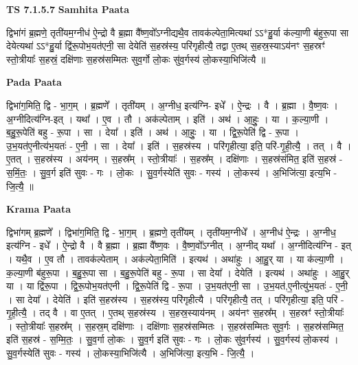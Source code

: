 \documentclass[17pt]{extarticle}
\begin{document}
\textbf{TS 7.1.5.7 } \newline
\textbf{Samhita Paata} \newline

द्विभा॑गं ब्र॒ह्मणे॒ तृती॑यम॒ग्नीध॑ ऐ॒न्द्रो वै ब्र॒ह्मा वै᳚ष्ण॒वो᳚ऽग्नीद्यथै॒व तावक॑ल्पेता॒मित्यथा॑ ऽऽ*हु॒र्या क॑ल्या॒णी ब॑हुरू॒पा सा देयेत्यथा॑ ऽऽ*हु॒र्या द्वि॑रू॒पोभ॒यत॑एनी॒ सा देयेति॑ स॒हस्र॑स्य॒ परि॑गृहीत्यै॒ तद्वा ए॒तथ् स॒हस्र॒स्याऽय॑नꣳ स॒हस्रꣳ॑ स्तो॒त्रीयाः᳚ स॒हस्रं॒ दक्षि॑णाः स॒हस्र॑सम्मितः सुव॒र्गो लो॒कः सु॑व॒र्गस्य॑ लो॒कस्या॒भिजि॑त्यै ॥ \newline

\textbf{Pada Paata} \newline

द्विभा॑ग॒मिति॒ द्वि - भा॒ग॒म् । ब्र॒ह्मणे᳚ । तृती॑यम् । अ॒ग्नीध॒ इत्य॑ग्नि- इधे᳚ । ऐ॒न्द्रः । वै । ब्र॒ह्मा । वै॒ष्ण॒वः । अ॒ग्नीदित्य॑ग्नि-इत् । यथा᳚ । ए॒व । तौ । अक॑ल्पेताम् । इति॑ । अथ॑ । आ॒हुः॒ । या । क॒ल्या॒णी । ब॒हु॒रू॒पेति॑ बहु - रू॒पा । सा । देया᳚ । इति॑ । अथ॑ । आ॒हुः॒ । या । द्वि॒रू॒पेति॑ द्वि - रू॒पा । उ॒भ॒यत॑ए॒नीत्य॑भ॒यतः॑ - ए॒नी॒ । सा । देया᳚ । इति॑ । स॒हस्र॑स्य । परि॑गृहीत्या॒ इति॒ परि॑-गृ॒ही॒त्यै॒ । तत् । वै । ए॒तत् । स॒हस्र॑स्य । अय॑नम् । स॒हस्र᳚म् । स्तो॒त्रीयाः᳚ । स॒हस्र᳚म् । दक्षि॑णाः । स॒हस्र॑संमित॒ इति॑ स॒हस्र॑ - स॒मिं॒तः॒ । सु॒व॒र्ग इति॑ सुवः - गः । लो॒कः । सु॒व॒र्गस्येति॑ सुवः - गस्य॑ । लो॒कस्य॑ । अ॒भिजि॑त्या॒ इत्य॒भि - जि॒त्यै॒ ॥  \newline


\textbf{Krama Paata} \newline

द्विभा॑गम् ब्र॒ह्मणे᳚ । द्विभा॑ग॒मिति॒ द्वि - भा॒ग॒म् । ब्र॒ह्मणे॒ तृती॑यम् । तृती॑यम॒ग्नीधे᳚ । अ॒ग्नीध॑ ऐ॒न्द्रः । अ॒ग्नीध॒ इत्य॑ग्नि - इधे᳚ । ऐ॒न्द्रो वै । वै ब्र॒ह्मा । ब्र॒ह्मा वै᳚ष्ण॒वः । वै॒ष्ण॒वो᳚ऽग्नीत् । अ॒ग्नीद् यथा᳚ । अ॒ग्नीदित्य॑ग्नि - इत् । यथै॒व । ए॒व तौ । तावक॑ल्पेताम् । अक॑ल्पेता॒मिति॑ । इत्यथ॑ । अथा॑हुः । आ॒हु॒र् या । या क॑ल्या॒णी । क॒ल्या॒णी ब॑हुरू॒पा । ब॒हु॒रू॒पा सा । ब॒हु॒रू॒पेति॑ बहु - रू॒पा । सा देया᳚ । देयेति॑ । इत्यथ॑ । अथा॑हुः । आ॒हु॒र् या । या द्वि॑रू॒पा । द्वि॒रू॒पोभ॒यत॑एनी । द्वि॒रू॒पेति॑ द्वि - रू॒पा । उ॒भ॒यत॑एनी॒ सा । उ॒भ॒यत॑,ए॒नीत्यु॑भ॒यतः॑ - ए॒नी॒ । सा देया᳚ । देयेति॑ । इति॑ स॒हस्र॑स्य । स॒हस्र॑स्य॒ परि॑गृहीत्यै । परि॑गृहीत्यै॒ तत् । परि॑गृहीत्या॒ इति॒ परि॑ - गृ॒ही॒त्यै॒ । तद् वै । वा ए॒तत् । ए॒तथ् स॒हस्र॑स्य । स॒हस्र॒स्याय॑नम् । अय॑नꣳ स॒हस्र᳚म् । स॒हस्रꣳ॑ स्तो॒त्रीयाः᳚ । स्तो॒त्रीयाः᳚ स॒हस्र᳚म् । स॒हस्र॒म् दक्षि॑णाः । दक्षि॑णाः स॒हस्र॑सम्मितः । स॒हस्र॑सम्मितः सुव॒र्गः । स॒हस्र॑सम्मित॒ इति॑ स॒हस्र॑ - स॒म्मि॒तः॒ । सु॒व॒र्गा लो॒कः । सु॒व॒र्ग इति॑ सुवः - गः । लो॒कः सु॑व॒र्गस्य॑ । सु॒व॒र्गस्य॑ लो॒कस्य॑ । सु॒व॒र्गस्येति॑ सुवः - गस्य॑ । लो॒कस्या॒भिजि॑त्यै । अ॒भिजि॑त्या॒ इत्य॒भि - जि॒त्यै॒ । \newline
\end{document}

